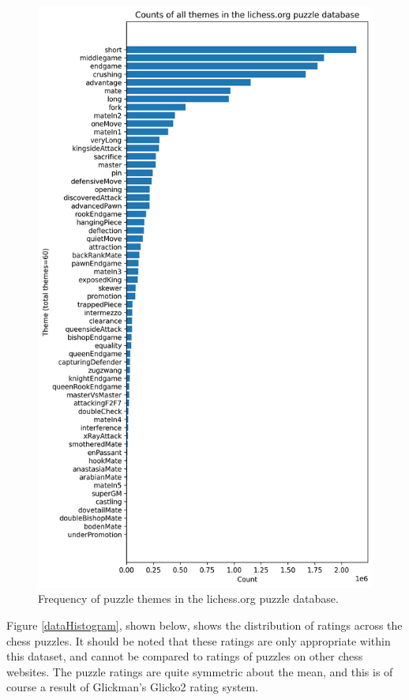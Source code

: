 \begin{figure}
    \centering
    \includegraphics[width=0.9\linewidth]{project/img/puzzle_theme_counts.png}
    \caption{Frequency of puzzle themes in the lichess.org puzzle database.\cite{lichessPuzzles}}
    \label{dataThemeCounts}
\end{figure}

Figure \ref{dataHistogram}, shown below, shows the distribution of ratings
across the chess puzzles. It should be noted that these ratings are only
appropriate within this dataset, and cannot be compared to ratings of puzzles
on other chess websites. The puzzle ratings are quite symmetric about the mean,
and this is of course a result of Glickman's Glicko2 rating
system.\cite{glicko}

